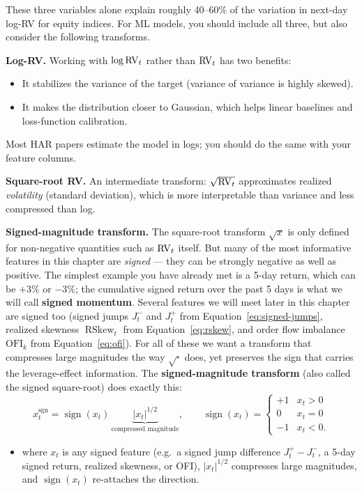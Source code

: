 These three variables alone explain roughly 40--60\% of the variation in next-day log-RV for equity indices.
For ML models, you should include all three, but also consider the following transforms.

\textbf{Log-RV.} Working with $\log \operatorname{RV}_t$ rather than $\operatorname{RV}_t$ has two benefits:
\begin{itemize}[nosep]
  \item It stabilizes the variance of the target (variance of variance is highly skewed).
  \item It makes the distribution closer to Gaussian, which helps linear baselines and loss-function calibration.
\end{itemize}
Most HAR papers estimate the model in logs; you should do the same with your feature columns.

\textbf{Square-root RV.} An intermediate transform: $\sqrt{\operatorname{RV}_t}$ approximates realized \emph{volatility} (standard deviation), which is more interpretable than variance and less compressed than log.

\textbf{Signed-magnitude transform.}
The square-root transform $\sqrt{x}$ is only defined for non-negative quantities such as $\operatorname{RV}_t$ itself. But many of the most informative features in this chapter are \emph{signed} --- they can be strongly negative as well as positive. The simplest example you have already met is a 5-day return, which can be $+3\%$ or $-3\%$; the cumulative signed return over the past 5 days is what we will call \textbf{signed momentum}. Several features we will meet later in this chapter are signed too (signed jumps $J_t^-$ and $J_t^+$ from Equation~\ref{eq:signed-jumps}, realized skewness $\operatorname{RSkew}_t$ from Equation~\ref{eq:rskew}, and order flow imbalance $\text{OFI}_k$ from Equation~\ref{eq:ofi}). For all of these we want a transform that compresses large magnitudes the way $\sqrt{\cdot}$ does, yet preserves the sign that carries the leverage-effect information. The \textbf{signed-magnitude transform} (also called the signed square-root) does exactly this:
\begin{equation}\label{eq:signed-magnitude}
x_t^{\text{sgn}} = \operatorname{sign}(x_t)\,\underbrace{|x_t|^{1/2}}_{\text{compressed magnitude}},
\qquad \operatorname{sign}(x_t) = \begin{cases} +1 & x_t > 0 \\ 0 & x_t = 0 \\ -1 & x_t < 0. \end{cases}
\end{equation}
\begin{itemize}[nosep]
  \item where $x_t$ is any signed feature (e.g.\ a signed jump difference $J_t^+ - J_t^-$, a 5-day signed return, realized skewness, or OFI), $|x_t|^{1/2}$ compresses large magnitudes, and $\operatorname{sign}(x_t)$ re-attaches the direction.
\end{itemize}

